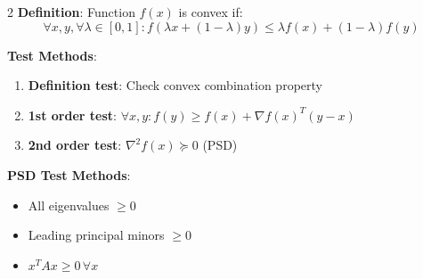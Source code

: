 \documentclass[10pt,a4paper,landscape]{article}
\begin{document}
\begin{multicols}{2}
\textbf{Definition}: Function $f(x)$ is convex if:
$$\forall x,y, \forall \lambda \in [0,1]: f(\lambda x + (1-\lambda)y) \leq \lambda f(x) + (1-\lambda)f(y)$$

\textbf{Test Methods}:
\begin{enumerate}
\item \textbf{Definition test}: Check convex combination property
\item \textbf{1st order test}: $\forall x,y: f(y) \geq f(x) + \nabla f(x)^T(y - x)$
\item \textbf{2nd order test}: $\nabla^2 f(x) \succeq 0$ (PSD)
\end{enumerate}

\textbf{PSD Test Methods}:
\begin{itemize}
\item All eigenvalues $\geq 0$
\item Leading principal minors $\geq 0$
\item $x^T A x \geq 0 \, \forall x$
\end{itemize}

\end{multicols}

\newpage
\end{document}
